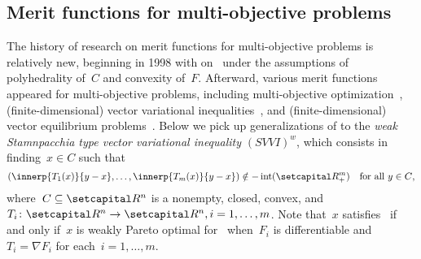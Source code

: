 \documentclass[../../main]{subfiles}
\begin{document}
\subsection{Merit functions for multi-objective problems} 
The history of research on merit functions for multi-objective problems is relatively new, beginning in 1998 with \textcite{Chen1998} on~ under the assumptions of polyhedrality of~$C$ and convexity of~$F$.
Afterward, various merit functions appeared for multi-objective problems, including multi-objective optimization~\cite{Liu2009,Dutta2017}, (finite-dimensional) vector variational inequalities~\cite{Chen2000,Konnov2005,Li2005,Yang2002,Yang2003,Charitha2010,Li2010}, and (finite-dimensional) vector equilibrium problems~\cite{Huang2007,Li2005,Li2007,Li2006,Mastroeni2003}.
Below we pick up generalizations of  to the \emph{weak Stamnpacchia type vector variational inequality} $(SVVI)^w$, which consists in finding~$x \in C$ such that
\begin{equation} \label{eq:SVVIw}
    (\innerp{T_1(x)}{y - x}, \dots, \innerp{T_m(x)}{y - x}) \notin - \interior(\setRpos^m) \forallcondition{y \in C}
,\end{equation} 
where~$C \subseteq \setR^n$ is a nonempty, closed, convex, and $T_i \colon \setR^n \to \setR^n, i = 1, \dots, m$.
Note that~$x$ satisfies~ if and only if~$x$ is weakly Pareto optimal for~ when~$F_i$ is differentiable and~$T_i = \nabla F_i$ for each~$i = 1, \dots, m$.
\end{document}
